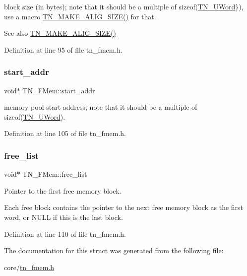 block size (in bytes); note that it should be a multiple of {\ttfamily sizeof(\hyperlink{tn__arch__example_8h_ab80cba0fe9ffcd9011d53dfeb9e39bf4}{T\+N\+\_\+\+U\+Word}\})}, use a macro {\ttfamily \hyperlink{tn__common_8h_a3f48380e8a624edc643319a81192d88e}{T\+N\+\_\+\+M\+A\+K\+E\+\_\+\+A\+L\+I\+G\+\_\+\+S\+I\+Z\+E()}} for that. 

\begin{DoxySeeAlso}{See also}
{\ttfamily \hyperlink{tn__common_8h_a3f48380e8a624edc643319a81192d88e}{T\+N\+\_\+\+M\+A\+K\+E\+\_\+\+A\+L\+I\+G\+\_\+\+S\+I\+Z\+E()}} 
\end{DoxySeeAlso}


Definition at line 95 of file tn\+\_\+fmem.\+h.

\mbox{\label{structTN__FMem_a7eac768da37c99efd90ae56ebde527cf}} 
\subsubsection{\texorpdfstring{start\+\_\+addr}{start\_addr}}
{\footnotesize\ttfamily void$\ast$ T\+N\+\_\+\+F\+Mem\+::start\+\_\+addr}



memory pool start address; note that it should be a multiple of {\ttfamily sizeof(\hyperlink{tn__arch__example_8h_ab80cba0fe9ffcd9011d53dfeb9e39bf4}{T\+N\+\_\+\+U\+Word})}. 



Definition at line 105 of file tn\+\_\+fmem.\+h.

\mbox{\label{structTN__FMem_a00ffa3c416a57946d95ab8814168eedb}} 
\subsubsection{\texorpdfstring{free\+\_\+list}{free\_list}}
{\footnotesize\ttfamily void$\ast$ T\+N\+\_\+\+F\+Mem\+::free\+\_\+list}



Pointer to the first free memory block. 

Each free block contains the pointer to the next free memory block as the first word, or {\ttfamily N\+U\+LL} if this is the last block. 

Definition at line 110 of file tn\+\_\+fmem.\+h.



The documentation for this struct was generated from the following file\+:\begin{DoxyCompactItemize}
\item 
core/\hyperlink{tn__fmem_8h}{tn\+\_\+fmem.\+h}\end{DoxyCompactItemize}
